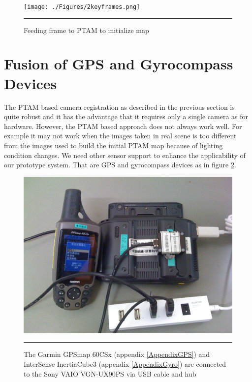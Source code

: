 \begin{figure}[htbp]
	\centering
	\texttt{[image: ./Figures/2keyframes.png]}
	\rule{35em}{0.5pt}
	\caption[Feeding frame to PTAM to initialize map]{Feeding frame to PTAM to initialize map}
	\label{fig:2KeyFrames}
\end{figure}


\section{Fusion of GPS and Gyrocompass Devices}

The PTAM based camera registration as described in the previous section is quite robust and it has the advantage that it requires only a single camera as for hardware. However, the PTAM based approach does not always work well. For example it may not work when the images taken in real scene is too different from the images used to build the initial PTAM map because of lighting condition changes. We need other sensor support to enhance the applicability of our prototype system. That are GPS and gyrocompass devices as in figure \ref{fig:VAIOGPSGyro}.

\begin{figure}[htbp]
	\centering
	\includegraphics[width=14cm]{./Primitives/vaio_gps_gyro.jpg}
	\rule{35em}{0.5pt}
	\caption[Fusion of GPS and gyrocompass devices]{The Garmin GPSmap 60CSx (appendix \ref{AppendixGPS}) and InterSense InertiaCube3 (appendix \ref{AppendixGyro}) are connected to the Sony VAIO VGN-UX90PS via USB cable and hub}
	\label{fig:VAIOGPSGyro}
\end{figure}

